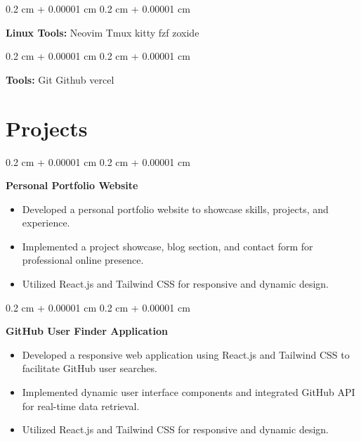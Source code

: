 \documentclass[10pt, letterpaper]{article}
\newenvironment{highlights}{
    \begin{itemize}[
        topsep=0.10 cm,
        parsep=0.10 cm,
        partopsep=0pt,
        itemsep=0pt,
        leftmargin=0.4 cm + 10pt
    ]
}{
    \end{itemize}
} %
\newenvironment{onecolentry}{
    \begin{adjustwidth}{
        0.2 cm + 0.00001 cm
    }{
        0.2 cm + 0.00001 cm
    }
}{
    \end{adjustwidth}
} %
\begin{document}
        \vspace{0.2 cm}

        \begin{onecolentry}
            \textbf{Linux Tools:} Neovim Tmux kitty fzf zoxide
        \end{onecolentry}

        \vspace{0.2 cm}

        \begin{onecolentry}
            \textbf{Tools:} Git Github vercel
        \end{onecolentry}



    \section{Projects}




        \begin{onecolentry}
            \textbf{Personal Portfolio Website}
            \begin{highlights}
                \item Developed a personal portfolio website to showcase skills, projects, and experience.
                \item Implemented a project showcase, blog section, and contact form for professional online presence.
                \item Utilized React.js and Tailwind CSS for responsive and dynamic design.
            \end{highlights}
        \end{onecolentry}


        \vspace{0.2 cm}

        \begin{onecolentry}
            \textbf{GitHub User Finder Application}
            \begin{highlights}
                \item Developed a responsive web application using React.js and Tailwind CSS to facilitate GitHub user searches.
                \item Implemented dynamic user interface components and integrated GitHub API for real-time data retrieval.
                \item Utilized React.js and Tailwind CSS for responsive and dynamic design.
            \end{highlights}
        \end{onecolentry}
\end{document}
